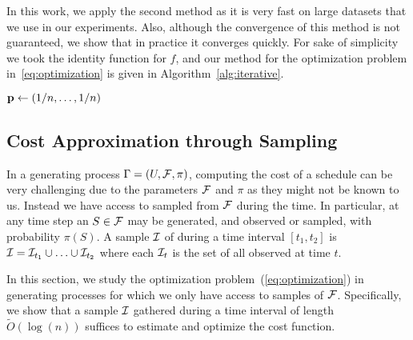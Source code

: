 In this work, we apply the second method as it is very fast on large datasets
that we use in our experiments. Also, although the convergence of this method is
not guaranteed, we show that in practice it converges quickly. For sake of
simplicity we took the identity function for $f$, and our method for the
optimization problem in~\eqref{eq:optimization} is given in
Algorithm~\ref{alg:iterative}.


\begin{algorithm}[ht]
	\DontPrintSemicolon
	$\mathbf{p} \leftarrow (1/n, \ldots, 1/n)$\;
	\Return{$\p$}\;
	\caption{$\optimizer(\texttt{iterations})$}
	\label{alg:iterative}
\end{algorithm}  

\subsection{Cost Approximation through Sampling}\label{sec:sampcomp}
	In a generating process $\Gamma = (U, \mathcal{F}, \pi)$, computing the cost of a schedule can be very challenging due to the parameters $\mathcal{F}$ and $\pi$ as they might not be known to us.
	Instead we have access to sampled {\ins} from $\mathcal{F}$ during the time. In particular, at any time step an {\ins} $S\in\mathcal{F}$ may be generated, and observed or sampled, with probability $\pi(S)$. A sample $\mathcal{I}$ of {\ins} during a time interval $[t_1, t_2]$ is $\mathcal{I}=\mathcal{I}_{t_1}\cup\ldots\cup\mathcal{I}_{t_2}$ where each $\mathcal{I}_t$ is the set of all observed {\ins} at time $t$.

	In this section, we study the optimization problem~(\ref{eq:optimization}) in generating processes for which we only have access to samples of $\mathcal{F}$. Specifically, we show that a sample $\mathcal{I}$ gathered during a time interval of length $\tilde O(\log(n))$ suffices to estimate and optimize the cost function.


